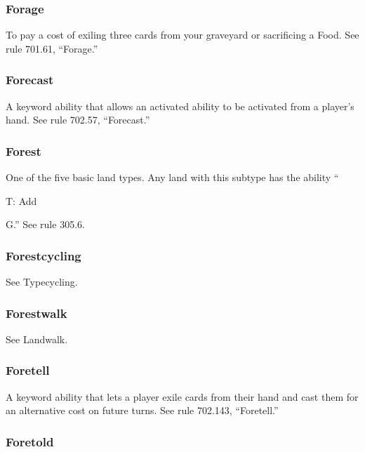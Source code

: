 {{{{{{{{{{{\subsubsection*{Forage}

To pay a cost of exiling three cards from your graveyard or sacrificing a Food. See rule 701.61, “Forage.”

\subsubsection*{Forecast}

A keyword ability that allows an activated ability to be activated from a player’s hand. See rule 702.57, “Forecast.”

\subsubsection*{Forest}

One of the five basic land types. Any land with this subtype has the ability “{T: Add {G.” See rule 305.6.

\subsubsection*{Forestcycling}

See Typecycling.

\subsubsection*{Forestwalk}

See Landwalk.

\subsubsection*{Foretell}

A keyword ability that lets a player exile cards from their hand and cast them for an alternative cost on future turns. See rule 702.143, “Foretell.”

\subsubsection*{Foretold}

}}}}}}}}}}}}}
